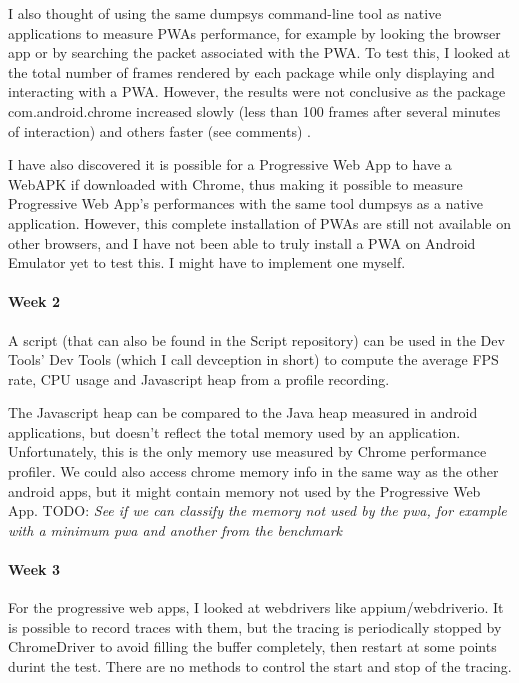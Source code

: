 \documentclass{kththesis}
\begin{document}
I also thought of using the same dumpsys command-line tool as native applications to measure PWAs performance, for example by looking the browser app or by searching the packet associated with the PWA. To test this,  I looked at the total number of frames rendered by each package while only displaying and interacting with a PWA. However, the results were not conclusive as the package com.android.chrome increased slowly (less than 100 frames after several minutes of interaction) and others faster (see comments) %
. 

I have also discovered it is possible for a Progressive Web App to have a WebAPK if downloaded with Chrome, thus making it possible to measure Progressive Web App's performances with the same tool dumpsys as a native application. However, this complete installation of PWAs are still not available on other browsers, and I have not been able to truly install a PWA on Android Emulator yet to test this. I might have to implement one myself. 
\paragraph{Week 2}
 A script (that can also be found in the Script repository) can be used in the Dev Tools' Dev Tools (which I call devception in short) to compute the average FPS rate, CPU usage and Javascript heap from a profile recording.

The Javascript heap can be compared to the Java heap measured in android applications, but doesn't reflect the total memory used by an application. Unfortunately, this is the only memory use measured by Chrome performance profiler. We could also access chrome memory info in the same way as the other android apps, but it might contain memory not used by the Progressive Web App.
\newline
TODO: 
\textit{See if we can classify the memory not used by the pwa, for example with a minimum pwa and another from the benchmark}
\paragraph{Week 3}
For the progressive web apps, I looked at webdrivers like appium/webdriverio. It is possible to record traces with them, but the tracing is periodically stopped by ChromeDriver to avoid filling the buffer completely, then restart at some points durint the test. There are no methods to control the start and stop of the tracing.  
\end{document}
